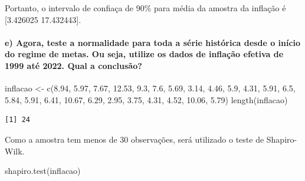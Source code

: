 \documentclass[
  letterpaper,
  DIV=11,
  numbers=noendperiod]{scrartcl}
\let\oldparagraph\paragraph
\renewcommand{\paragraph}[1]{\oldparagraph{#1}\mbox{}}
\newenvironment{Shaded}{\begin{snugshade}}{\end{snugshade}}
\newcommand{\FloatTok}[1]{\textcolor[rgb]{0.68,0.00,0.00}{#1}}
\newcommand{\FunctionTok}[1]{\textcolor[rgb]{0.28,0.35,0.67}{#1}}
\newcommand{\NormalTok}[1]{\textcolor[rgb]{0.00,0.23,0.31}{#1}}
\newcommand{\OtherTok}[1]{\textcolor[rgb]{0.00,0.23,0.31}{#1}}
\begin{document}
Portanto, o intervalo de confiaça de 90\% para média da amostra da
inflação é {[}3.426025 17.432443{]}.

\hypertarget{e-agora-teste-a-normalidade-para-toda-a-suxe9rie-histuxf3rica-desde-o-inuxedcio-do-regime-de-metas.-ou-seja-utilize-os-dados-de-inflauxe7uxe3o-efetiva-de-1999-atuxe9-2022.-qual-a-conclusuxe3o}{%
\paragraph{e) Agora, teste a normalidade para toda a série histórica
desde o início do regime de metas. Ou seja, utilize os dados de inflação
efetiva de 1999 até 2022. Qual a
conclusão?}\label{e-agora-teste-a-normalidade-para-toda-a-suxe9rie-histuxf3rica-desde-o-inuxedcio-do-regime-de-metas.-ou-seja-utilize-os-dados-de-inflauxe7uxe3o-efetiva-de-1999-atuxe9-2022.-qual-a-conclusuxe3o}}

\begin{Shaded}
\begin{Highlighting}[]
\NormalTok{inflacao }\OtherTok{\textless{}{-}} \FunctionTok{c}\NormalTok{(}\FloatTok{8.94}\NormalTok{, }\FloatTok{5.97}\NormalTok{, }\FloatTok{7.67}\NormalTok{, }\FloatTok{12.53}\NormalTok{, }\FloatTok{9.3}\NormalTok{, }\FloatTok{7.6}\NormalTok{, }\FloatTok{5.69}\NormalTok{, }\FloatTok{3.14}\NormalTok{, }\FloatTok{4.46}\NormalTok{, }\FloatTok{5.9}\NormalTok{, }\FloatTok{4.31}\NormalTok{, }\FloatTok{5.91}\NormalTok{, }\FloatTok{6.5}\NormalTok{, }\FloatTok{5.84}\NormalTok{, }\FloatTok{5.91}\NormalTok{, }\FloatTok{6.41}\NormalTok{, }\FloatTok{10.67}\NormalTok{, }\FloatTok{6.29}\NormalTok{, }\FloatTok{2.95}\NormalTok{, }\FloatTok{3.75}\NormalTok{, }\FloatTok{4.31}\NormalTok{, }\FloatTok{4.52}\NormalTok{, }\FloatTok{10.06}\NormalTok{, }\FloatTok{5.79}\NormalTok{)}
\FunctionTok{length}\NormalTok{(inflacao)}
\end{Highlighting}
\end{Shaded}

\begin{verbatim}
[1] 24
\end{verbatim}

Como a amostra tem menos de 30 observações, será utilizado o teste de
Shapiro-Wilk.

\begin{Shaded}
\begin{Highlighting}[]
\FunctionTok{shapiro.test}\NormalTok{(inflacao)}
\end{Highlighting}
\end{Shaded}
\end{document}
